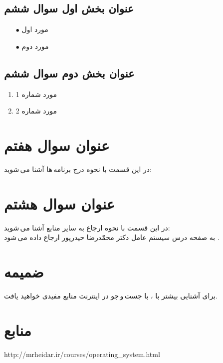 \documentclass{article}
\begin{document}
\subsection{عنوان بخش اول سوال ششم}
\begin{itemize}
    \item [$\bullet$] مورد اول
    \item [$\bullet$] مورد دوم
\end{itemize}
\subsection{عنوان بخش دوم سوال ششم}
\begin{enumerate}
    \item مورد شماره 1
    \item مورد شماره 2
\end{enumerate}

\section{عنوان سوال هفتم}
در این قسمت با نحوه درج برنامه\,ها آشنا می\,شوید:
\lr{}

\section{عنوان سوال هشتم}
در این قسمت با نحوه ارجاع به سایر منابع آشنا می\,شوید:\\
\indent
به صفحه درس سیستم عامل دکتر محمّدرضا حیدرپور ارجاع داده می\,شود \cite{b1}.

\section{ضمیمه}
برای آشنایی بیشتر با \lr{\LaTeX}، با جست\,و\,جو در اینترنت منابع مفیدی خواهید یافت.


\section*{منابع}
\renewcommand{\section}[2]{}%
\begin{thebibliography}{99} %


\begin{LTRitems}

\resetlatinfont

 http://mrheidar.ir/courses/operating\_system.html
\end{LTRitems}

\end{thebibliography}
\end{document}
